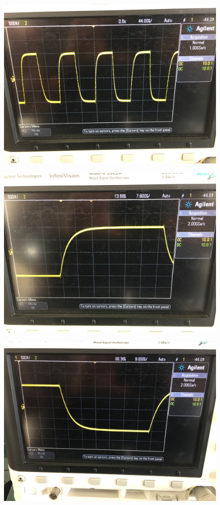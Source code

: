 \documentclass{article}
\begin{document}
\begin{figure}[H]
	\centering
	\includegraphics[width=0.7\linewidth]{IMG_6451}
	\label{fig:img6451}
\end{figure}
\begin{figure}[H]
	\centering
	\includegraphics[width=0.7\linewidth]{IMG_6452}
	\label{fig:img6452}
\end{figure}
\begin{figure}[H]
	\centering
	\includegraphics[width=0.7\linewidth]{IMG_6453}
	\label{fig:img6453}
\end{figure}
\end{document}
